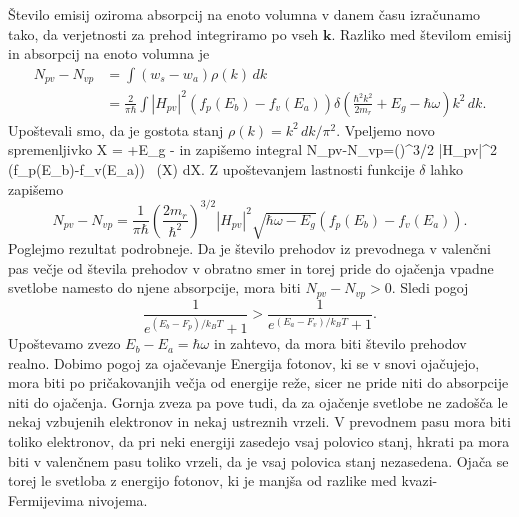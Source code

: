 Število emisij oziroma absorpcij na enoto volumna v danem času izračunamo tako,
da verjetnosti za prehod integriramo po vseh $\mathbf{k}$. Razliko med številom 
emisij in absorpcij na enoto volumna je
\begin{align}  
N_{pv}-N_{vp}&=\int\left(w_s-w_a\right)\rho(k)\,dk  \nonumber \\
&=\frac{2}{\pi\hbar} \int |H_{pv}|^2\left(f_p(E_b)-f_v(E_a)\right)
\delta \left(\frac{\hbar^2 k^2}{2m_r}+E_g -\hbar\omega\right) k^2\,dk.
\label{6.7}
\end{align}
Upoštevali smo, da je gostota stanj $\rho(k)=k^2\, dk/\pi^2$. Vpeljemo
novo spremenljivko 
\beq
X = +E_g -\hbar\omega
\eeq
in zapišemo integral
\beq
N_{pv}-N_{vp}=\left(\right)^{3/2} 
\int |H_{pv}|^2 \left(f_p(E_b)-f_v(E_a)\right)
\,
\delta (X) dX.
\label{6.7a}
\eeq
Z upoštevanjem lastnosti funkcije $\delta$ lahko zapišemo
\begin{equation}  
N_{pv}-N_{vp}=\frac{1}{\pi\hbar}\left(\frac{2m_r}{\hbar^2}\right)^{3/2}
|H_{pv}|^2 \sqrt{\hbar \omega-E_g}\left(f_p(E_b)-f_v(E_a)\right).
\label{6.11}
\end{equation}
Poglejmo rezultat podrobneje. Da je število prehodov iz prevodnega v valenčni pas
večje od števila prehodov v obratno smer in torej pride do ojačenja vpadne svetlobe 
namesto do njene absorpcije, mora biti $N_{pv}-N_{vp} >0$. Sledi pogoj
\begin{equation}  
\frac{1}{e^{(E_b-F_{p})/k_B T}+1}>\frac{1}{e^{(E_a-F_v)/k_B T}+1}.
\label{6.12}
\end{equation}
Upoštevamo zvezo $E_b-E_a = \hbar \omega$ in zahtevo, da mora biti število prehodov realno. 
Dobimo pogoj za ojačevanje 
Energija fotonov, ki se v snovi ojačujejo, mora biti po pričakovanjih večja od
energije reže, sicer ne pride niti do absorpcije niti do ojačenja. Gornja zveza pa pove tudi, 
da za ojačenje svetlobe ne zadošča le nekaj vzbujenih elektronov in nekaj ustreznih vrzeli. 
V prevodnem pasu mora biti toliko elektronov, da pri neki energiji zasedejo vsaj polovico stanj, 
hkrati pa mora biti v valenčnem pasu toliko vrzeli, da je vsaj polovica stanj nezasedena.
Ojača se torej le svetloba z energijo fotonov, ki je manjša od razlike med kvazi-Fermijevima
nivojema. 

